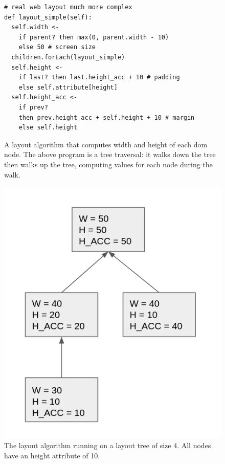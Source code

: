 \begin{figure}
\begin{minipage}[b]{0.68\linewidth}
\begin{verbatim}
# real web layout much more complex
def layout_simple(self): 
  self.width <-
    if parent? then max(0, parent.width - 10)
    else 50 # screen size
  children.forEach(layout_simple)
  self.height <-
    if last? then last.height_acc + 10 # padding
    else self.attribute[height]
  self.height_acc <-
    if prev?
    then prev.height_acc + self.height + 10 # margin
    else self.height
\end{verbatim}
\caption{A layout algorithm that computes width and height of each dom node. The above program is a tree traversal: it walks down the tree then walks up the tree, computing values for each node during the walk.}
\label{fig:layout-simple}
\end{minipage}\hfill%
\begin{minipage}[b]{0.28\linewidth}
\centering
\includegraphics[scale=0.23]{LayoutExample.png}
\caption{The layout algorithm running on a layout tree of size 4. All nodes have an height attribute of 10.}
\end{minipage}
\end{figure}

